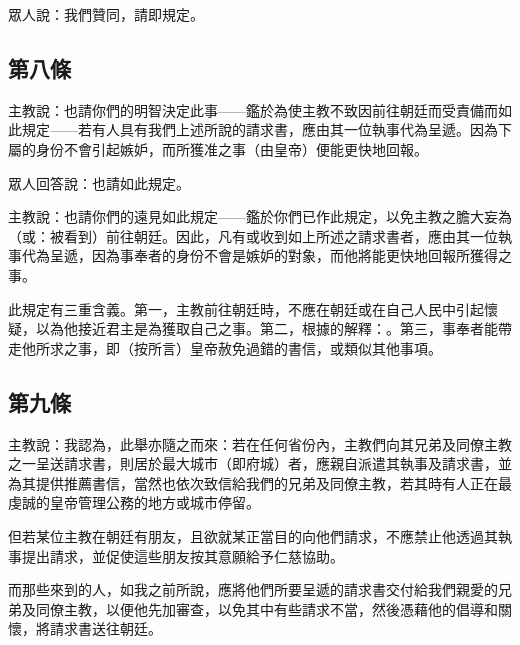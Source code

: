 眾人說：我們贊同，請即規定。\par


\subsection{第八條}

主教說：也請你們的明智決定此事——鑑於為使主教不致因前往朝廷而受責備而如此規定——若有人具有我們上述所說的請求書，應由其一位執事代為呈遞。因為下屬的身份不會引起嫉妒，而所獲准之事（由皇帝）便能更快地回報。\par

眾人回答說：也請如此規定。\par

主教說：也請你們的遠見如此規定——鑑於你們已作此規定，以免主教之膽大妄為（或：被看到）前往朝廷。因此，凡有或收到如上所述之請求書者，應由其一位執事代為呈遞，因為事奉者的身份不會是嫉妒的對象，而他將能更快地回報所獲得之事。\par

\par

此規定有三重含義。第一，主教前往朝廷時，不應在朝廷或在自己人民中引起懷疑，以為他接近君主是為獲取自己之事。第二，根據的解釋：。第三，事奉者能帶走他所求之事，即（按所言）皇帝赦免過錯的書信，或類似其他事項。\par


\subsection{第九條}

主教說：我認為，此舉亦隨之而來：若在任何省份內，主教們向其兄弟及同僚主教之一呈送請求書，則居於最大城市（即府城）者，應親自派遣其執事及請求書，並為其提供推薦書信，當然也依次致信給我們的兄弟及同僚主教，若其時有人正在最虔誠的皇帝管理公務的地方或城市停留。\par

但若某位主教在朝廷有朋友，且欲就某正當目的向他們請求，不應禁止他透過其執事提出請求，並促使這些朋友按其意願給予仁慈協助。\par

而那些來到的人，如我之前所說，應將他們所要呈遞的請求書交付給我們親愛的兄弟及同僚主教，以便他先加審查，以免其中有些請求不當，然後憑藉他的倡導和關懷，將請求書送往朝廷。\par

